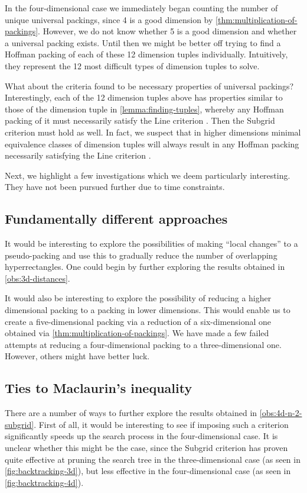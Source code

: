 \noindent In the four-dimensional case we immediately began counting the number of unique universal packings, since 4 is a good dimension by \cref{thm:multiplication-of-packings}. However, we do not know whether 5 is a good dimension and whether a universal packing exists. Until then we might be better off trying to find a Hoffman packing of each of these 12 dimension tuples individually. Intuitively, they represent the 12 most difficult types of dimension tuples to solve.

\begin{remark}
What about the criteria found to be necessary properties of universal packings? Interestingly, each of the 12 dimension tuples above has properties similar to those of the dimension tuple in \cref{lemma:finding-tuples}, whereby any Hoffman packing of it must necessarily satisfy the Line criterion . Then the Subgrid criterion  must hold as well. In fact, we suspect that in higher dimensions minimal equivalence classes of dimension tuples will always result in any Hoffman packing necessarily satisfying the Line criterion .
\end{remark}

\noindent 

\noindent Next, we highlight a few investigations which we deem particularly interesting. They have not been pursued further due to time constraints.

\subsection{Fundamentally different approaches}
It would be interesting to explore the possibilities of making ``local changes'' to a pseudo-packing and use this to gradually reduce the number of overlapping hyperrectangles. One could begin by further exploring the results obtained in \cref{obs:3d-distances}.

It would also be interesting to explore the possibility of reducing a higher dimensional packing to a packing in lower dimensions. This would enable us to create a five-dimensional packing via a reduction of a six-dimensional one obtained via \cref{thm:multiplication-of-packings}. We have made a few failed attempts at reducing a four-dimensional packing to a three-dimensional one. However, others might have better luck.

\subsection{Ties to Maclaurin's inequality}
There are a number of ways to further explore the results obtained in \cref{obs:4d-n-2-subgrid}. First of all, it would be interesting to see if imposing such a criterion significantly speeds up the search process in the four-dimensional case. It is unclear whether this might be the case, since the Subgrid criterion  has proven quite effective at pruning the search tree in the three-dimensional case (as seen in \cref{fig:backtracking-3d}), but less effective in the four-dimensional case (as seen in \cref{fig:backtracking-4d}).


